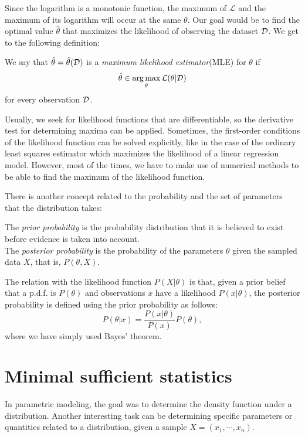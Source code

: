 Since the logarithm is a monotonic function, the maximum of $\mathcal L$ and the maximum of its logarithm will occur at the same $\theta$.   Our goal would be to find the optimal value $\hat{\theta}$ that maximizes the likelihood of observing the dataset $\mathcal{D}$. We get to the following definition:

\begin{ndef}
    We say that $\hat{\theta} = \hat\theta (\mathcal{D})$ is a \emph{maximum likelihood estimator}(MLE) for $\theta$ if  
    $$
    \hat\theta \in \operatorname*{arg\,max}_{\theta} \mathcal L(\theta | \mathcal{D})
    $$
    for every observation $\mathcal{D}$. 
\end{ndef}

Usually, we seek for likelihood functions that are differentiable, so the derivative test for determining maxima can be applied. Sometimes, the first-order conditions of the likelihood function can be solved explicitly, like in the case of the ordinary least squares estimator which maximizes the likelihood of a linear regression model. However, most of the times, we have to make use of numerical methods to be able to find the maximum of the likelihood function.

There is another concept related to the probability and the set of parameters that the distribution takes:
\begin{ndef}
The \emph{prior probability} is the probability distribution that it is believed to exist before evidence is taken into account.\\

The \emph{posterior probability} is the probability of the parameters $\theta$ given the sampled data $X$, that is, $P(\theta,X)$.
\end{ndef}
The relation with the likelihood function $P(X|\theta)$ is that, given a prior belief that a p.d.f. is $P(\theta)$ and observations $x$ have a likelihood $P(x|\theta)$, the posterior probability is defined using the prior probability as follows:
\[
P(\theta|x) = \frac{P(x|\theta)}{P(x)} P(\theta),   
\]
where we have simply used Bayes' theorem.

\section{Minimal sufficient statistics}

In parametric modeling, the goal was to determine the density function under a distribution. Another interesting task can be determining specific parameters or quantities related to a distribution, given a sample $X = (x_1,\cdots,x_n)$.

